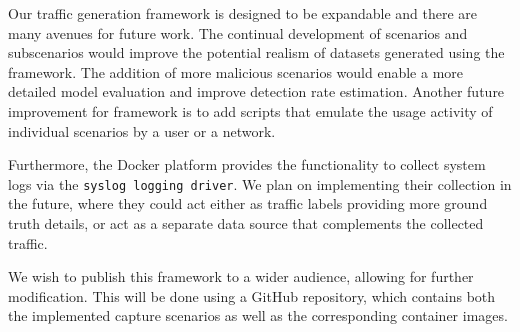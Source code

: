 \documentclass[conference]{IEEEtran}
\begin{document}
Our traffic generation framework is designed to be expandable and there are many avenues for future work. The continual development of scenarios and subscenarios would improve the potential realism of datasets generated using the framework. The addition of more malicious scenarios would enable a more detailed model evaluation and improve detection rate estimation. 
Another future improvement for framework is to add scripts that emulate the usage activity of individual scenarios by a user or a network. 


Furthermore, the Docker platform provides the functionality to collect system logs via the \texttt{syslog logging driver}. We plan on implementing their collection in the future, where they could act either as traffic labels providing more ground truth details, or act as a separate data source that complements the collected traffic.

We wish to publish this framework to a wider audience, allowing for further modification. This will be done using a GitHub repository, which contains both the implemented capture scenarios as well as the corresponding container images.






 


\end{document}
